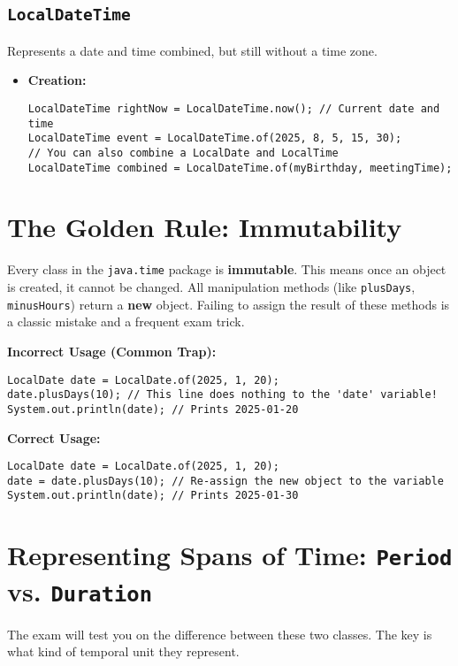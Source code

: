 \documentclass[12pt]{article}
\begin{document}
\begin{enumerate}[label=(\arabic*)]
\subsection{\texttt{LocalDateTime}}
Represents a date and time combined, but still without a time zone.
\begin{itemize}
    \item \textbf{Creation:}
    \begin{verbatim}
LocalDateTime rightNow = LocalDateTime.now(); // Current date and time
LocalDateTime event = LocalDateTime.of(2025, 8, 5, 15, 30);
// You can also combine a LocalDate and LocalTime
LocalDateTime combined = LocalDateTime.of(myBirthday, meetingTime);
    \end{verbatim}
\end{itemize}

\section{The Golden Rule: Immutability}
Every class in the \texttt{java.time} package is \textbf{immutable}. This means once an object is created, it cannot be changed. All manipulation methods (like \texttt{plusDays}, \texttt{minusHours}) return a \textbf{new} object. Failing to assign the result of these methods is a classic mistake and a frequent exam trick.

\textbf{Incorrect Usage (Common Trap):}
\begin{verbatim}
LocalDate date = LocalDate.of(2025, 1, 20);
date.plusDays(10); // This line does nothing to the 'date' variable!
System.out.println(date); // Prints 2025-01-20
\end{verbatim}

\textbf{Correct Usage:}
\begin{verbatim}
LocalDate date = LocalDate.of(2025, 1, 20);
date = date.plusDays(10); // Re-assign the new object to the variable
System.out.println(date); // Prints 2025-01-30
\end{verbatim}

\section{Representing Spans of Time: \texttt{Period} vs. \texttt{Duration}}
The exam will test you on the difference between these two classes. The key is what kind of temporal unit they represent.


\end{enumerate}
\end{document}
